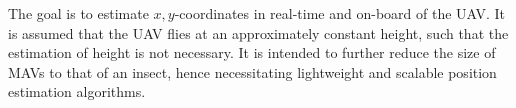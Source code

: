The goal is to estimate $x,y$-coordinates in real-time and on-board of the UAV. It is assumed that the UAV flies at an approximately constant height, such that the estimation of height is not necessary.  It is intended to further reduce the size of MAVs to that of an
insect, hence necessitating lightweight and scalable position
estimation algorithms.
